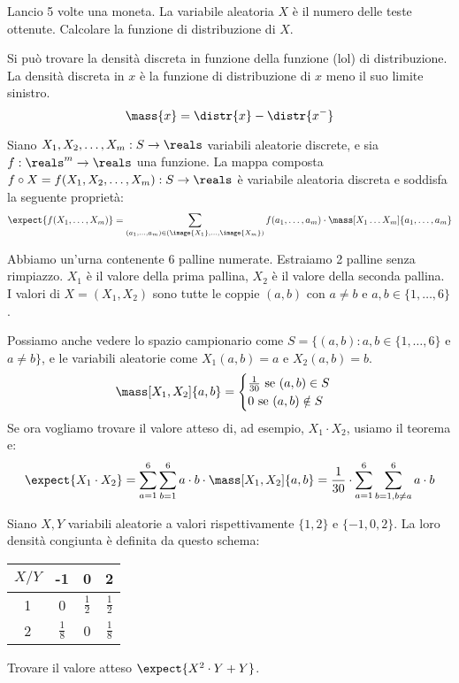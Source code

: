 \begin{esercizio}
Lancio 5 volte una moneta. La variabile aleatoria $X$ \`e il numero delle teste ottenute. Calcolare la funzione di distribuzione di $X$.
\end{esercizio}
Si pu\`o trovare la densit\`a discreta in funzione della funzione (lol) di distribuzione. La densit\`a discreta in $x$ \`e la funzione di distribuzione di $x$ meno il suo limite sinistro.
\[
\mass{x} = \distr{x} - \distr{x^{-}}
\]

\begin{prop}
Siano $X_1, X_2, \ldots, X_m : S \to \reals$ variabili aleatorie discrete, e sia $f : \reals^m \to \reals$ una funzione. La mappa composta $f \circ X = f(X_1, X_2, \ldots, X_m) : S \to \reals$ \`e variabile aleatoria discreta e soddisfa la seguente propriet\`a:
\[
\expect{f(X_1, \ldots, X_m)} = \sum_{(a_1, \ldots, a_m) \in (\image{X_1},  \ldots, \image{X_m})} f(a_1, \ldots, a_m) \cdot \mass[X_1 \ldots X_m]{a_1, \ldots, a_m}
\]
\end{prop}

\begin{exmp}
Abbiamo un'urna contenente 6 palline numerate. Estraiamo 2 palline senza rimpiazzo. $X_1$ \`e il valore della prima pallina, $X_2$ \`e il valore della seconda pallina. I valori di $X = (X_1, X_2)$ sono tutte le coppie $(a,b)$ con $a \neq b$ e $a,b \in \{ 1, \dots, 6\}$.

Possiamo anche vedere lo spazio campionario come $S = \{ (a,b) : a,b \in \{1, \dots, 6\}$ e $a \neq b\}$, e le variabili aleatorie come $ X_1(a,b) = a$ e $X_2(a,b) = b$.
\[
\mass[X_1, X_2]{a,b} = 
\begin{cases}
\frac{1}{30} \text{ se } (a,b) \in S \\
0 \text{ se } (a,b) \notin S
\end{cases}
\]
Se ora vogliamo trovare il valore atteso di, ad esempio, $X_1 \cdot X_2$, usiamo il teorema e:
\[
\expect{X_1 \cdot X_2} = \sum_{a = 1}^{6} \sum_{b = 1}^{6} a \cdot b \cdot \mass[X_1, X_2]{a,b} =
\frac{1}{30} \cdot \sum_{a = 1}^{6} \sum_{b = 1, b \neq a}^{6} a \cdot b
\]
\end{exmp}
\begin{esercizio}
Siano $X, Y$ variabili aleatorie a valori rispettivamente $\{1, 2\}$ e $\{-1, 0, 2\}$. La loro densit\`a congiunta \`e definita da questo schema:
\begin{center}
\begin{tabular}{c|ccc}
$X / Y$ & -1 & 0 & 2 \\
\hline
1 & 0 & $\frac{1}{2}$ & $\frac{1}{2}$ \\
2 & $\frac{1}{8}$ & 0 & $\frac{1}{8}$
\end{tabular}
\end{center}
Trovare il valore atteso $\expect{X^2 \cdot Y + Y}$.
\end{esercizio}

